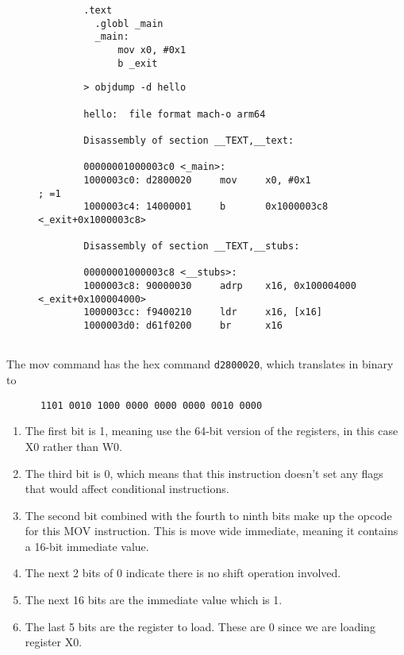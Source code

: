   \begin{example}
    \begin{figure}[H]
      \centering 
      \begin{lstlisting}
        .text
          .globl _main
          _main:
              mov x0, #0x1
              b _exit
      \end{lstlisting}
      \caption{} 
    \end{figure} 

    \begin{figure}[H]
      \centering 
      \begin{lstlisting}
        > objdump -d hello 

        hello:  file format mach-o arm64

        Disassembly of section __TEXT,__text:

        00000001000003c0 <_main>:
        1000003c0: d2800020     mov     x0, #0x1                ; =1
        1000003c4: 14000001     b       0x1000003c8 <_exit+0x1000003c8>

        Disassembly of section __TEXT,__stubs:

        00000001000003c8 <__stubs>:
        1000003c8: 90000030     adrp    x16, 0x100004000 <_exit+0x100004000>
        1000003cc: f9400210     ldr     x16, [x16]
        1000003d0: d61f0200     br      x16
        
      \end{lstlisting}
      \caption{} 
    \end{figure}

    The mov command has the hex command \texttt{d2800020}, which translates in binary to 
    \begin{lstlisting}
      1101 0010 1000 0000 0000 0000 0010 0000
    \end{lstlisting}

    \begin{enumerate}
      \item The first bit is 1, meaning use the 64-bit version of the registers, in this case X0 rather than W0.

      \item The third bit is 0, which means that this instruction doesn’t set any flags that would affect conditional instructions.

      \item The second bit combined with the fourth to ninth bits make up the opcode for this MOV instruction. This is move wide immediate, meaning it contains a 16-bit immediate value.

      \item The next 2 bits of 0 indicate there is no shift operation involved.

      \item The next 16 bits are the immediate value which is 1.

      \item The last 5 bits are the register to load. These are 0 since we are loading register X0.
    \end{enumerate}
  \end{example}

